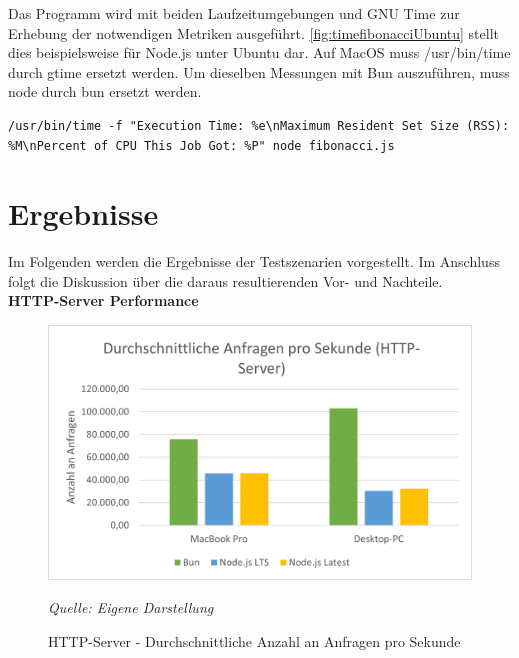 \noindent
Das Programm wird mit beiden Laufzeitumgebungen und GNU Time zur Erhebung der notwendigen Metriken ausgeführt. \autoref{fig:timefibonacciUbuntu} stellt dies beispielsweise für Node.js unter Ubuntu dar. Auf MacOS muss \glq /usr/bin/time\grq{} durch \glq gtime\grq{} ersetzt werden. Um dieselben Messungen mit Bun auszuführen, muss \glq node\grq{} durch \glq bun\grq{} ersetzt werden.
\begin{lstlisting}[caption={[Messung der Fibonacci-Folge auf dem Desktop-PC]Messung der Fibonacci-Folge auf dem Desktop-PC\\\textit{Quelle: Eigene Darstellung}},label={fig:timefibonacciUbuntu}]
	/usr/bin/time -f "Execution Time: %e\nMaximum Resident Set Size (RSS): %M\nPercent of CPU This Job Got: %P" node fibonacci.js
\end{lstlisting}



\section{Ergebnisse} \label{sec:performance-results}
Im Folgenden werden die Ergebnisse der Testszenarien vorgestellt. Im Anschluss folgt die Diskussion über die daraus resultierenden Vor- und Nachteile.\\

\noindent
\textbf{HTTP-Server Performance}
\begin{figure}[h!]
	\centering
	\includegraphics[width=\linewidth]{./images/httpServerAverageRequestsPerSecond.png}
	\caption{HTTP-Server - Durchschnittliche Anzahl an Anfragen pro Sekunde}
	\label{fig:httpServerAverageRequestsPerSecond}
	\textit{Quelle: Eigene Darstellung}
\end{figure}


